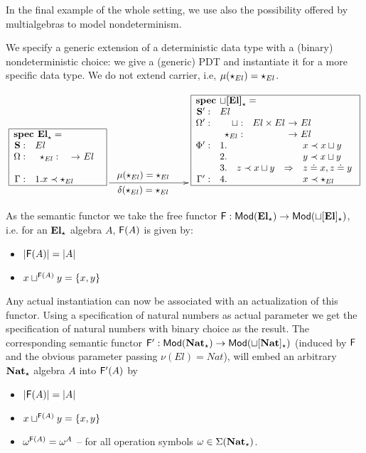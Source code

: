 In the final example of the whole setting, we use also the possibility
offered by multialgebras to model nondeterminism. 
\begin{example}
We specify a 
generic extension of a deterministic data type with a (binary)
nondeterministic choice: we give a (generic) PDT
and instantiate it for a more specific data type.
We do not extend carrier, i.e, $\mu(\star_{El})=\star_{El}$.

\( \xymatrix{
\frame{\txt{\spec{
	\tit{\mbox{\bf spec\ El}_\cons^{{}}=} \\
		\spSorts{\Sorts} {El}
		\spOps{\Ops}{	\cons_{El}: &&  El \\ \ \\ }
		\Gamma:	&1. x \prec \cons_{El}%
	} } }
\ar[rrr]^<<<<<<<<<<<<<{\txt{\normalsize{$\mu(\cons_{El})=\cons_{El}$}}}_<<<<<<<<<<<<<{\txt{\normalsize{$\delta(\cons_{El})=\cons_{El}$}}}
&&&
\frame{\txt{\spec{
	\tit{\mbox{\bf spec\ $\choice$[El]}_\cons^{{}}=} \\
		\spSorts{\Sorts'} {El}
		\spOps{\Ops'} {
			\choice: & El \times El & El\\
			\cons_{El}: &&  El \\	}
		\Phi':
			&1.& 			&& x \prec x \choice y \\
			&2.& 			&& y \prec x \choice y \\
			&3.& z\prec x\choice y	
					& \To 	 & z \eleq x, z \eleq y\\
		\Gamma':	&4.& && x \prec \cons_{El}\\
	}} }
}
\)

\noindent
As the semantic functor we take the free functor ${\sf {F}}:{\sf {Mod}}({\bf El_\star}) \to
{\sf {Mod}}({\bf \sqcup[El]_\star})$, i.e. for an ${\bf El_\star}$ algebra $A$, 
${\sf {F}}(A)$ is  given by:
\begin{itemize}\MyLPar
\item $|{\sf {F}}(A)| = |A|$
\item $x \sqcup^{{\sf {F}}(A)} y = \{ x,y \}$
\end{itemize}
Any actual instantiation can now be associated with an actualization of this
functor. 
Using a specification of natural numbers as actual parameter we get the
specification of natural numbers with
binary choice as the result. The corresponding semantic functor
${\sf {F'}}:{\sf {Mod}}({\bf Nat_\star}) \to {\sf {Mod}}({\bf \sqcup[Nat]_\star})$
(induced by
${\sf {F}}$ and the obvious parameter passing $\nu(El)=Nat$), 
will embed an arbitrary ${\bf Nat_\star}$ 
algebra $A$ into ${\sf {F}}'(A)$ by
\begin{itemize}\MyLPar
	\item $|{\sf {F}}(A)| = |A|$
	\item $x \sqcup^{{\sf {F}}(A)} y = \{ x,y \}$
	\item ${\omega}^{{\sf {F}}(A)} = {\omega}^A$ -- for all operation
	symbols $\omega\in\Sigma({\bf Nat_\star})$.
	\end{itemize}
\end{example}
